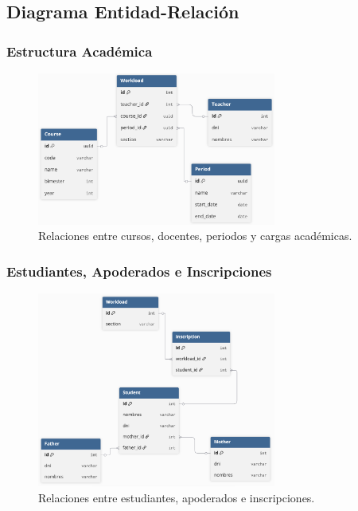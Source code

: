 \documentclass{article}
\begin{document}
    \subsection{Diagrama Entidad-Relación}
        \subsubsection{Estructura Académica}
            \begin{figure}[H]
                \centering
                \includegraphics[width=0.7\textwidth]{images/RI1.png}
                \caption{Relaciones entre cursos, docentes, periodos y cargas académicas.}
            \end{figure}
        \subsubsection{Estudiantes, Apoderados e Inscripciones}
            \begin{figure}[H]
                \centering
                \includegraphics[width=0.7\textwidth]{images/RI2.png}
                \caption{Relaciones entre estudiantes, apoderados e inscripciones.}
            \end{figure}
\end{document}
